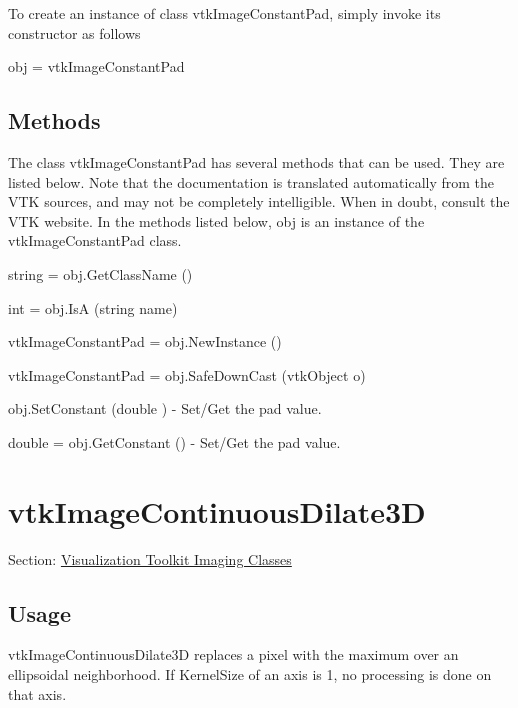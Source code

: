 To create an instance of class vtk\-Image\-Constant\-Pad, simply invoke its constructor as follows \begin{DoxyVerb}  obj = vtkImageConstantPad
\end{DoxyVerb}
 \hypertarget{vtkwidgets_vtkxyplotwidget_Methods}{}\subsection{Methods}\label{vtkwidgets_vtkxyplotwidget_Methods}
The class vtk\-Image\-Constant\-Pad has several methods that can be used. They are listed below. Note that the documentation is translated automatically from the V\-T\-K sources, and may not be completely intelligible. When in doubt, consult the V\-T\-K website. In the methods listed below, {\ttfamily obj} is an instance of the vtk\-Image\-Constant\-Pad class. 
\begin{DoxyItemize}
\item {\ttfamily string = obj.\-Get\-Class\-Name ()}  
\item {\ttfamily int = obj.\-Is\-A (string name)}  
\item {\ttfamily vtk\-Image\-Constant\-Pad = obj.\-New\-Instance ()}  
\item {\ttfamily vtk\-Image\-Constant\-Pad = obj.\-Safe\-Down\-Cast (vtk\-Object o)}  
\item {\ttfamily obj.\-Set\-Constant (double )} -\/ Set/\-Get the pad value.  
\item {\ttfamily double = obj.\-Get\-Constant ()} -\/ Set/\-Get the pad value.  
\end{DoxyItemize}\hypertarget{vtkimaging_vtkimagecontinuousdilate3d}{}\section{vtk\-Image\-Continuous\-Dilate3\-D}\label{vtkimaging_vtkimagecontinuousdilate3d}
Section\-: \hyperlink{sec_vtkimaging}{Visualization Toolkit Imaging Classes} \hypertarget{vtkwidgets_vtkxyplotwidget_Usage}{}\subsection{Usage}\label{vtkwidgets_vtkxyplotwidget_Usage}
vtk\-Image\-Continuous\-Dilate3\-D replaces a pixel with the maximum over an ellipsoidal neighborhood. If Kernel\-Size of an axis is 1, no processing is done on that axis.

